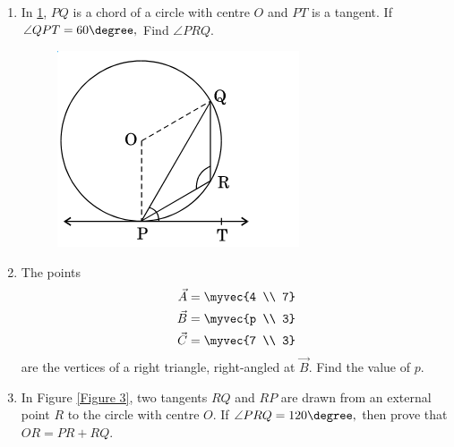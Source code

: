 \begin{enumerate}
\item In \ref{Figure 2}, $PQ$ is a chord of a circle with centre $O$ and $PT$ is a tangent. If $\angle QPT = 60 \degree,$ Find $\angle PRQ $.
\begin{figure}[h!]
	\centering
    \includegraphics[width=\columnwidth]{figs/cbse_30_3_2.png}
	\label{Figure 2}
\end{figure}
\item The points 
\begin{align*}
 \vec{A}&= \myvec{4 \\ 7}\\  
 \vec{B}&=\myvec{p \\ 3}\\  
 \vec{C}&=\myvec{7 \\ 3}
\end{align*}
are the vertices of a right triangle, right-angled at $ \vec{B} $. Find the value of $p$.
\item In Figure \ref{Figure 3}, two tangents $RQ$ and $RP$ are drawn from an external point $R$ to the circle with centre $O$. If $\angle PRQ = 120 \degree,$ then prove that $OR = PR + RQ$.
  \begin{figure}[h!]
	\centering

\end{figure}
\end{enumerate}
